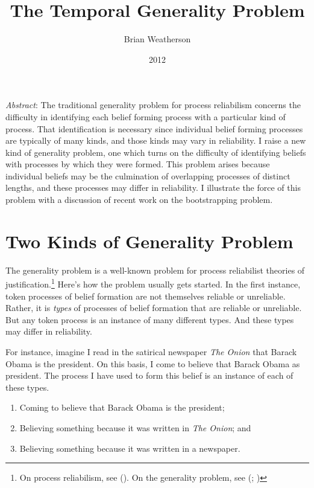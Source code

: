 \documentclass[
  11pt,
  letterpaper,
  DIV=11,
  numbers=noendperiod,
  twoside]{scrartcl}
\title{The Temporal Generality Problem}
\author{Brian Weatherson}
\date{2012}
\providecommand{\tightlist}{%
  \setlength{\itemsep}{0pt}\setlength{\parskip}{0pt}}
\renewenvironment{abstract}
 {\vspace{-1.25cm}
 \quotation\small\noindent\emph{Abstract}:}
 {\endquotation}
\renewenvironment{abstract}
 {\quotation\small\noindent\emph{Abstract}:}
 {\endquotation\vspace{-0.02cm}}
\begin{document}
\maketitle
\begin{abstract}
The traditional generality problem for process reliabilism concerns the
difficulty in identifying each belief forming process with a particular
kind of process. That identification is necessary since individual
belief forming processes are typically of many kinds, and those kinds
may vary in reliability. I raise a new kind of generality problem, one
which turns on the difficulty of identifying beliefs with processes by
which they were formed. This problem arises because individual beliefs
may be the culmination of overlapping processes of distinct lengths, and
these processes may differ in reliability. I illustrate the force of
this problem with a discussion of recent work on the bootstrapping
problem.
\end{abstract}


\section{Two Kinds of Generality
Problem}\label{two-kinds-of-generality-problem}

The generality problem is a well-known problem for process reliabilist
theories of justification.\footnote{On process reliabilism, see
  (). On the generality problem,
  see (;
  )} Here's how
the problem usually gets started. In the first instance, token processes
of belief formation are not themselves reliable or unreliable. Rather,
it is \emph{types} of processes of belief formation that are reliable or
unreliable. But any token process is an instance of many different
types. And these types may differ in reliability.

For instance, imagine I read in the satirical newspaper \emph{The Onion}
that Barack Obama is the president. On this basis, I come to believe
that Barack Obama as president. The process I have used to form this
belief is an instance of each of these types.

\begin{enumerate}
\def\labelenumi{\arabic{enumi}.}
\tightlist
\item
  Coming to believe that Barack Obama is the president;
\item
  Believing something because it was written in \emph{The Onion}; and
\item
  Believing something because it was written in a newspaper.
\end{enumerate}
\end{document}
